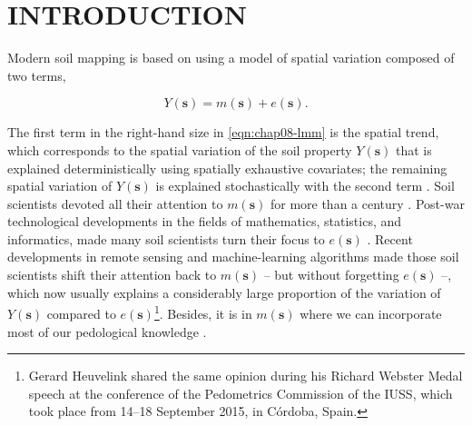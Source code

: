 \formatchapter

\section{INTRODUCTION}
\label{sec:chap08-intro}

Modern soil mapping is based on using a model of spatial variation composed of two terms, 

\begin{equation}\label{eqn:chap08-lmm} %
 Y(\boldsymbol{s}) = m(\boldsymbol{s}) + e(\boldsymbol{s}).
\end{equation}

\def\footgerard{\footnote{Gerard Heuvelink shared the same opinion during his Richard Webster Medal speech at 
the conference of the Pedometrics Commission of the IUSS, which took place from 14--18 September 2015, in 
Córdoba, Spain.}}

\noindent The first term in the right-hand size in \autoref{eqn:chap08-lmm} is the spatial trend, 
which corresponds to the spatial variation of the soil property $Y(\boldsymbol{s})$ that is explained 
deterministically using spatially exhaustive covariates; the remaining spatial variation of 
$Y(\boldsymbol{s})$ is explained stochastically with the second term \cite{Cressie1993}. Soil scientists 
devoted all their attention to $m(\boldsymbol{s})$ for more than a century \cite{Jenny1961, Florinsky2012}. 
Post-war technological developments in the fields of mathematics, statistics, and informatics, made many soil 
scientists turn their focus to $e(\boldsymbol{s})$ \cite{WebsterEtAl1990}. Recent developments in remote 
sensing and machine-learning algorithms made those soil scientists shift their attention back to 
$m(\boldsymbol{s})$ \cite{MooreEtAl1993} -- but without forgetting $e(\boldsymbol{s})$ \cite{OdehEtAl1994} 
--, which now usually explains a considerably large proportion of the variation of $Y(\boldsymbol{s})$ 
compared to $e(\boldsymbol{s})$\footgerard. Besides, it is in $m(\boldsymbol{s})$ where we can incorporate 
most of our pedological knowledge \cite{Lark2012}.

